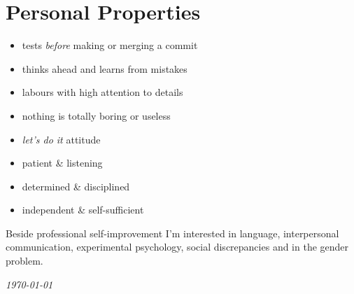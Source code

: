 \documentclass[a4paper,12pt]{article}
\newcommand\Yell{\textbf}
\newcommand\Label{\textsf}
\newcommand{\compress}{\setlength\itemsep{-\parskip}}
\newcommand{\midline}{\rule[0.5ex]{\linewidth-\parindent}{.5pt}}
\newenvironment{compressedItemize}{\begin{itemize}\compress}{\end{itemize}}
\begin{document}
%

\section{Personal Properties}

\begin{multicols}{2}
\begin{compressedItemize}
\item	tests \textit{before} making or merging a commit
\item	thinks ahead and learns from mistakes
\item	labours with high attention to details
\item	nothing is totally boring or useless
\columnbreak
\item	\textit{let's do it} attitude
\item	patient \& listening
\item	determined \& disciplined
\item	independent \& self-sufficient
\end{compressedItemize}
\end{multicols}

\medskip

Beside professional self-improvement I'm interested in language, interpersonal
communication, experimental psychology, social discrepancies and in the gender
problem.

\center\itshape\today
\end{document}
